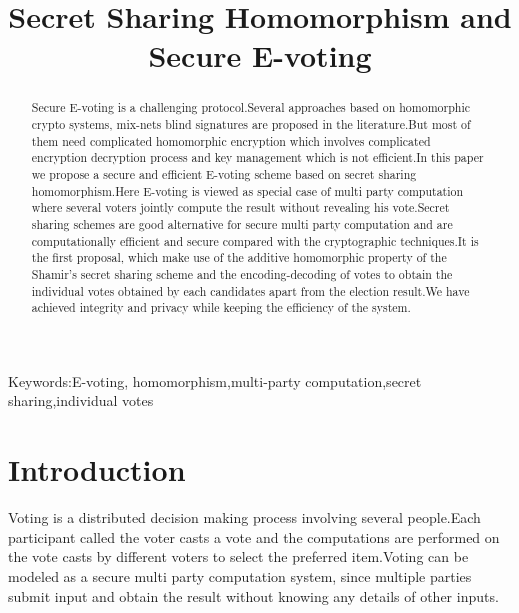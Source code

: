 \documentclass[conference]{IEEEtran}
\begin{document}
\title{Secret Sharing Homomorphism and Secure E-voting}
\author{
\and
{}
\and
{}
}
\maketitle
\begin{abstract}
Secure E-voting is a challenging protocol.Several approaches based on homomorphic crypto systems, mix-nets  blind signatures are proposed in the literature.But most of them need complicated homomorphic encryption which involves complicated encryption decryption process and key management which is not efficient.In this paper we propose a secure and efficient E-voting scheme based on secret sharing homomorphism.Here E-voting is viewed as special case of multi party computation where several voters jointly compute the result without revealing his vote.Secret sharing schemes are good alternative for secure multi party computation and are computationally efficient and secure compared with the cryptographic techniques.It is the first proposal, which  make use of the additive homomorphic property of the Shamir's secret sharing scheme and the encoding-decoding of votes to obtain the individual votes obtained by each candidates apart from the election result.We have achieved  integrity and privacy while keeping the efficiency of the system.
\end{abstract}
Keywords:E-voting, homomorphism,multi-party computation,secret sharing,individual votes
\section{Introduction}
Voting is a distributed decision making process involving several people.Each participant called the voter casts a vote and the computations are performed  on the vote casts by different voters to select the preferred item.Voting can be modeled as a secure multi party computation system, since multiple parties submit input and obtain the result without knowing any details of other inputs.
\end{document}
